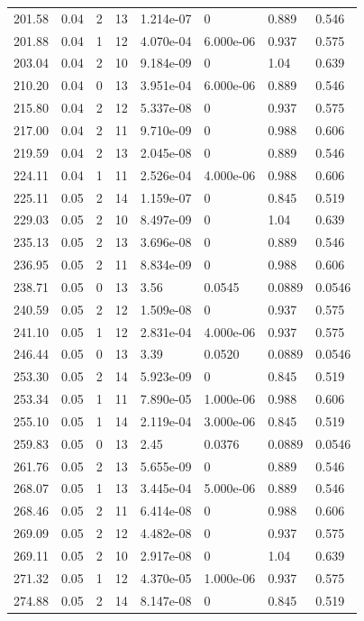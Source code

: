\documentclass[preview]{standalone}
\begin{document}
{{{\begin{tabular}{L{1.2cm}C{1.2cm} C{0.3cm}C{0.5cm} C{1.4cm}C{1.4cm} C{1.4cm}C{1.4cm}}
  201.58  &  0.04  & 2     & 13 &  1.214e-07  & 0  & 0.889 &  0.546   \\ 
  201.88  &  0.04  & 1     & 12 &  4.070e-04  & 6.000e-06  & 0.937 &  0.575   \\ 
  203.04  &  0.04  & 2     & 10 &  9.184e-09  & 0  & 1.04 &  0.639   \\ 
  210.20  &  0.04  & 0     & 13 &  3.951e-04  & 6.000e-06  & 0.889 &  0.546   \\ 
  215.80  &  0.04  & 2     & 12 &  5.337e-08  & 0  & 0.937 &  0.575   \\ 
  217.00  &  0.04  & 2     & 11 &  9.710e-09  & 0  & 0.988 &  0.606   \\ 
  219.59  &  0.04  & 2     & 13 &  2.045e-08  & 0  & 0.889 &  0.546   \\ 
  224.11  &  0.04  & 1     & 11 &  2.526e-04  & 4.000e-06  & 0.988 &  0.606   \\ 
  225.11  &  0.05  & 2     & 14 &  1.159e-07  & 0  & 0.845 &  0.519   \\ 
  229.03  &  0.05  & 2     & 10 &  8.497e-09  & 0  & 1.04 &  0.639   \\ 
  235.13  &  0.05  & 2     & 13 &  3.696e-08  & 0  & 0.889 &  0.546   \\ 
  236.95  &  0.05  & 2     & 11 &  8.834e-09  & 0  & 0.988 &  0.606   \\ 
  238.71  &  0.05  & 0     & 13 &  3.56  & 0.0545  & 0.0889 &  0.0546   \\ 
  240.59  &  0.05  & 2     & 12 &  1.509e-08  & 0  & 0.937 &  0.575   \\ 
  241.10  &  0.05  & 1     & 12 &  2.831e-04  & 4.000e-06  & 0.937 &  0.575   \\ 
  246.44  &  0.05  & 0     & 13 &  3.39  & 0.0520  & 0.0889 &  0.0546   \\ 
  253.30  &  0.05  & 2     & 14 &  5.923e-09  & 0  & 0.845 &  0.519   \\ 
  253.34  &  0.05  & 1     & 11 &  7.890e-05  & 1.000e-06  & 0.988 &  0.606   \\ 
  255.10  &  0.05  & 1     & 14 &  2.119e-04  & 3.000e-06  & 0.845 &  0.519   \\ 
  259.83  &  0.05  & 0     & 13 &  2.45  & 0.0376  & 0.0889 &  0.0546   \\ 
  261.76  &  0.05  & 2     & 13 &  5.655e-09  & 0  & 0.889 &  0.546   \\ 
  268.07  &  0.05  & 1     & 13 &  3.445e-04  & 5.000e-06  & 0.889 &  0.546   \\ 
  268.46  &  0.05  & 2     & 11 &  6.414e-08  & 0  & 0.988 &  0.606   \\ 
  269.09  &  0.05  & 2     & 12 &  4.482e-08  & 0  & 0.937 &  0.575   \\ 
  269.11  &  0.05  & 2     & 10 &  2.917e-08  & 0  & 1.04 &  0.639   \\ 
  271.32  &  0.05  & 1     & 12 &  4.370e-05  & 1.000e-06  & 0.937 &  0.575   \\ 
  274.88  &  0.05  & 2     & 14 &  8.147e-08  & 0  & 0.845 &  0.519   \\ 
\hline 
\end{tabular} 

}}}
\end{document}
